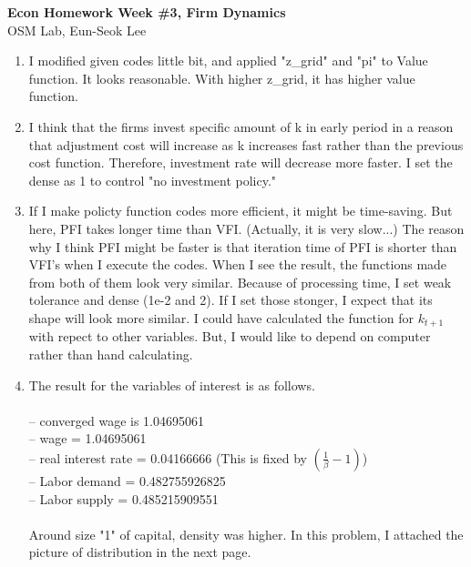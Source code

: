 \documentclass[letterpaper,12pt]{article}
\theoremstyle{definition}
\begin{document}
\begin{flushleft}
   \textbf{\large{Econ Homework Week \#3, Firm Dynamics}} \\[5pt]
   OSM Lab, Eun-Seok Lee \\[5pt]

\end{flushleft}

\vspace{5mm}

\begin{enumerate}



	\item I modified given codes little bit, and applied "z\_grid" and "pi" to Value function. It looks reasonable. With higher z\_grid, it has higher value function.


	\item I think that the firms invest specific amount of k in early period in a reason that adjustment cost will increase as k increases fast rather than the previous cost function. Therefore, investment rate will decrease more faster. I set the dense as 1 to control "no investment policy."


	\item If I make policty function codes more efficient, it might be time-saving. But here, PFI takes longer time than VFI. (Actually, it is very slow...) The reason why I think PFI might be faster is that iteration time of PFI is shorter than VFI's when I execute the codes. When I see the result, the functions made from both of them look very similar. Because of processing time, I set weak tolerance and dense (1e-2 and 2). If I set those stonger, I expect that its shape will look more similar. I could have calculated the function for $k_{t+1}$ with repect to other variables. But, I would like to depend on computer rather than hand calculating.


	\item The result for the variables of interest is as follows.\\ \\
-- converged wage is 1.04695061\\
-- wage = 1.04695061\\
-- real interest rate = 0.04166666 (This is fixed by $(\frac{1}{\beta}-1)$)\\
-- Labor demand = 0.482755926825 \\
-- Labor supply = 0.485215909551 \\ \\
Around size "1" of capital, density was higher. In this problem, I attached the picture of distribution in the next page.












\end{enumerate}

\vspace{25mm}


\end{document}
